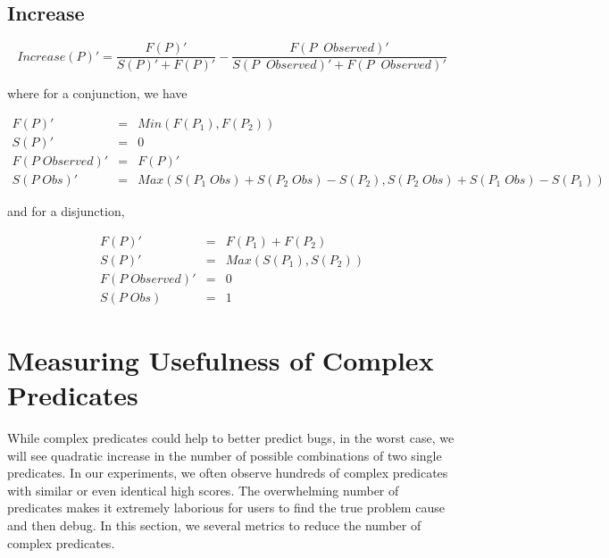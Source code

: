 \documentclass{article}
\begin{document}
\subsection{Increase}

\begin{equation}\label{increase}
    Increase(P)' = \frac{F(P)'}{S(P)'+F(P)'} - \frac{F(P\;\;Observed)'}{S(P\;\;Observed)'+F(P\;\;Observed)'}
\end{equation}

where for a conjunction, we have


\begin{eqnarray}
 \nonumber %
  F(P)' &=&  Min(F(P_1),F(P_2)) \\
 \nonumber
  S(P)' &=& 0 \\
 \nonumber
  F(P\;Observed)' &=& F(P)' \\
 \nonumber
  S(P\;Obs)' &=&
  Max(S(P_1\;Obs)+S(P_2\;Obs)-S(P_2),S(P_2\;Obs)+S(P_1\;Obs)-S(P_1))
\end{eqnarray}

and for a disjunction,

\begin{eqnarray}
 \nonumber %
  F(P)' &=&  F(P_1) + F(P_2) \\
 \nonumber
  S(P)' &=&  Max(S(P_1),S(P_2)) \\
 \nonumber
  F(P\;Observed)' &=& 0 \\
 \nonumber
  S(P\;Obs) &=& 1
\end{eqnarray}



\section{Measuring Usefulness of Complex Predicates}

While complex predicates could help to better predict bugs, in the
worst case, we will see quadratic increase in the number of
possible combinations of two single predicates. In our
experiments, we often observe hundreds of complex predicates with
similar or even identical high scores. The overwhelming number of
predicates makes it extremely laborious for users to find the true
problem cause and then debug. In this section, we several metrics
to reduce the number of complex predicates.
\end{document}
